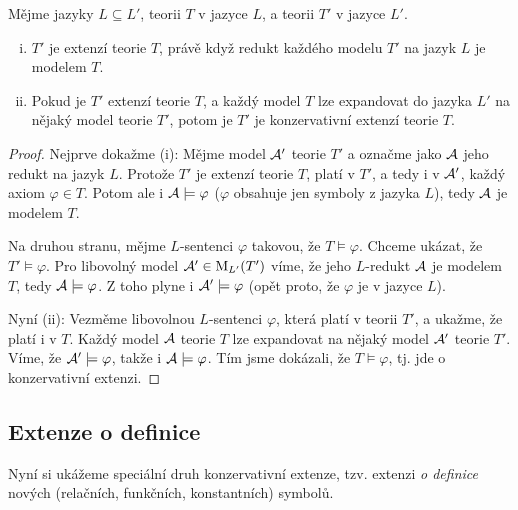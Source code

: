 \begin{proposition}\label{proposition:semantic-conditions-for-extensions}
    Mějme jazyky $L\subseteq L'$, teorii $T$ v jazyce $L$, a teorii $T'$ v jazyce $L'$.
    \begin{enumerate}[(i)]
        \item $T'$ je extenzí teorie $T$, právě když redukt každého modelu $T'$ na jazyk $L$ je modelem $T$.
        \item Pokud je $T'$ extenzí teorie $T$, a každý model $T$ lze expandovat do jazyka $L'$ na nějaký model teorie $T'$, potom je $T'$ je konzervativní extenzí teorie $T$.
        

    \end{enumerate}
\end{proposition}
\begin{proof}
    Nejprve dokažme (i): Mějme model $\mathcal{A}'$ teorie $T'$ a označme jako $\mathcal{A}$ jeho redukt na jazyk $L$. Protože $T'$ je extenzí teorie $T$, platí v $T'$, a tedy i v $\mathcal{A}'$, každý axiom $\varphi\in T$. Potom ale i $\mathcal{A}\models\varphi$ ($\varphi$ obsahuje jen symboly z jazyka $L$), tedy $\mathcal{A}$ je modelem $T$.

    Na druhou stranu, mějme $L$-sentenci $\varphi$ takovou, že $T\models\varphi$. Chceme ukázat, že $T'\models\varphi$. Pro libovolný model $\mathcal{A}'\in\operatorname{M}_{L'}(T')$ víme, že jeho $L$-redukt $\mathcal{A}$ je modelem $T$, tedy $\mathcal{A}\models\varphi$. Z toho plyne i $\mathcal{A}'\models\varphi$ (opět proto, že $\varphi$ je v jazyce $L$).

    Nyní (ii): Vezměme libovolnou $L$-sentenci $\varphi$, která platí v teorii $T'$, a ukažme, že platí i v $T$. Každý model $\mathcal{A}$ teorie $T$ lze expandovat na nějaký model $\mathcal{A}'$ teorie $T'$. Víme, že $\mathcal{A}'\models\varphi$, takže i $\mathcal{A}\models\varphi$. Tím jsme dokázali, že $T\models\varphi$, tj. jde o konzervativní extenzi.
    
\end{proof}


\subsection{Extenze o definice}\label{subsection:extension-by-definition}

Nyní si ukážeme speciální druh konzervativní extenze, tzv. extenzi \emph{o definice} nových (relačních, funkčních, konstantních) symbolů.


